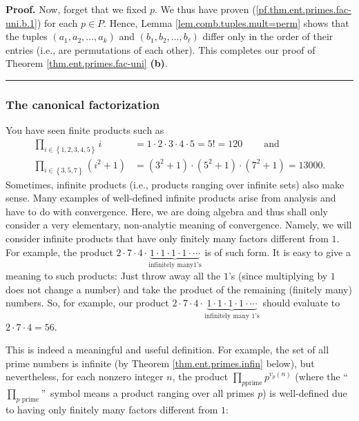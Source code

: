 \documentclass[numbers=enddot,12pt,final,onecolumn,notitlepage]{scrartcl}%
\numberwithin{exer}{subsection}
\theoremstyle{definition}
\newenvironment{proof}[1][Proof]{\noindent\textbf{#1.} }{\ \rule{0.5em}{0.5em}}
\let\prodnonlimits\prod
\renewcommand{\prod}{\prodnonlimits\limits}
\begin{document}
\begin{proof}
Now, forget that we fixed $p$. We thus have proven
(\ref{pf.thm.ent.primes.fac-uni.b.1}) for each $p\in P$. Hence, Lemma
\ref{lem.comb.tuples.mult=perm} shows that the tuples $\left(  a_{1}%
,a_{2},\ldots,a_{k}\right)  $ and $\left(  b_{1},b_{2},\ldots,b_{\ell}\right)
$ differ only in the order of their entries (i.e., are permutations of each
other). This completes our proof of Theorem \ref{thm.ent.primes.fac-uni}
\textbf{(b)}.
\end{proof}

\subsubsection{The canonical factorization}

You have seen finite products such as
\begin{align*}
\prod_{i\in\left\{  1,2,3,4,5\right\}  }i  &  =1\cdot2\cdot3\cdot
4\cdot5=5!=120\ \ \ \ \ \ \ \ \ \ \text{and}\\
\prod_{i\in\left\{  3,5,7\right\}  }\left(  i^{2}+1\right)   &  =\left(
3^{2}+1\right)  \cdot\left(  5^{2}+1\right)  \cdot\left(  7^{2}+1\right)
=13000.
\end{align*}
Sometimes, infinite products (i.e., products ranging over infinite sets) also
make sense. Many examples of well-defined infinite products arise from
analysis and have to do with convergence. Here, we are doing algebra and thus
shall only consider a very elementary, non-analytic meaning of convergence.
Namely, we will consider infinite products that have only finitely many
factors different from $1$. For example, the product $2\cdot7\cdot
4\cdot\underbrace{1\cdot1\cdot1\cdot1\cdot\cdots}_{\text{infinitely many
}1\text{'s}}$ is of such form. It is easy to give a meaning to such products:
Just throw away all the $1$'s (since multiplying by $1$ does not change a
number) and take the product of the remaining (finitely many) numbers. So, for
example, our product $2\cdot7\cdot4\cdot\underbrace{1\cdot1\cdot1\cdot
1\cdot\cdots}_{\text{infinitely many }1\text{'s}}$ should evaluate to
$2\cdot7\cdot4=56$.

This is indeed a meaningful and useful definition. For example, the set of all
prime numbers is infinite (by Theorem \ref{thm.ent.primes.infin} below), but
nevertheless, for each nonzero integer $n$, the product $\prod_{p\text{
prime}}p^{v_{p}\left(  n\right)  }$ (where the \textquotedblleft%
$\prod_{p\text{ prime}}$\textquotedblright\ symbol means a product ranging
over all primes $p$) is well-defined due to having only finitely many factors
different from $1$:
\end{document}
